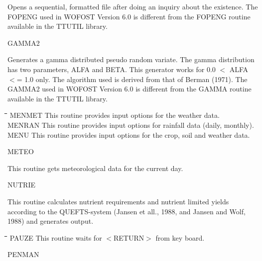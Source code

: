\documentclass[11pt]{article}
\begin{document}
\begin{indenting}{2.54cm}
Opens a sequential, formatted file after doing an inquiry about the exis\-tence. The FOPENG used in WOFOST Version 6.0 is different from the
FOPENG routine available in the TTUTIL library.
\end{indenting}
GAMMA2
\testlastline

\begin{indenting}{2.54cm}
Generates a gamma distributed pseudo random variate. The gamma distri\-bution has two parameters, ALFA and BETA. This generator works for
0.0 $<$ ALFA $<$= 1.0 only. The algorithm used is derived from that of
Berman (1971). The GAMMA2 used in WOFOST Version 6.0 is different
from the GAMMA routine available in the TTUTIL library.
\end{indenting}
\begin{tabbing}
\hspace{1.27cm}\=\hspace{1.27cm}\=\hspace{1.27cm}\=\hspace{1.27cm}\=%
\hspace{1.27cm}\=\hspace{1.27cm}\=\hspace{1.27cm}\=\hspace{1.27cm}\=%
\hspace{1.27cm}\=\hspace{1.27cm}\=\kill
MENMET\> \> This routine provides input options for the weather data.\\
MENRAN\> \> This routine provides input options for rainfall data (daily, monthly).\\
MENU\> \> This routine provides input options for the crop, soil and weather data.
\end{tabbing}
METEO
\testlastline

\begin{indenting}{2.54cm}
This routine gets meteorological data for the current day.
\end{indenting}
NUTRIE
\testlastline

\begin{indenting}{2.54cm}
This routine calculates nutrient requirements and nutrient limited yields
according to the QUEFTS-system (Jansen et all., 1988, and Jansen and
Wolf, 1988) and generates output.
\end{indenting}
\begin{tabbing}
\hspace{1.27cm}\=\hspace{1.27cm}\=\hspace{1.27cm}\=\hspace{1.27cm}\=%
\hspace{1.27cm}\=\hspace{1.27cm}\=\hspace{1.27cm}\=\hspace{1.27cm}\=%
\hspace{1.27cm}\=\hspace{1.27cm}\=\kill
PAUZE\> \> This routine waits for $<$RETURN$>$ from key board.
\end{tabbing}
PENMAN
\testlastline
\end{document}
